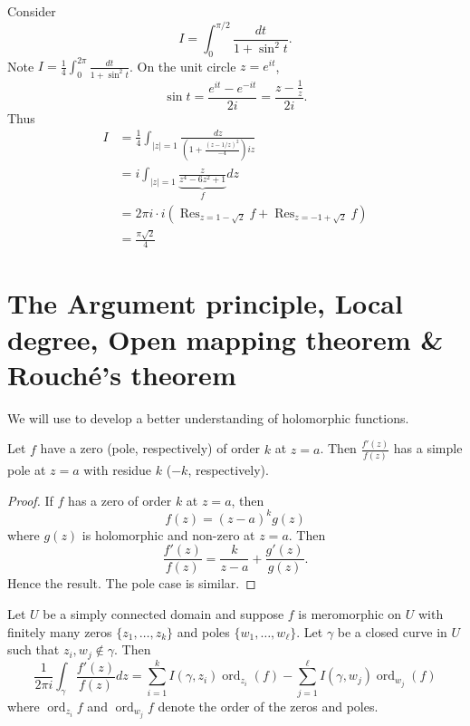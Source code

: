\documentclass[a4paper]{article}
\DeclareMathOperator*{\res}{Res}
\DeclareMathOperator*{\ord}{ord}
\begin{document}
\begin{eg}
  Consider
  \[
    I = \int_0^{\pi/2} \frac{dt}{1 + \sin^2 t}.
  \]
  Note \(I = \frac{1}{4} \int_0^{2\pi} \frac{dt}{1 + \sin^2 t}\). On the unit circle \(z = e^{it}\),
  \[
    \sin t = \frac{e^{it} - e^{-it}}{2i} = \frac{z - \frac{1}{z}}{2i}.
  \]
  Thus
  \begin{align*}
    I
    &= \frac{1}{4} \int_{|z| = 1} \frac{dz}{(1 + \frac{(z - 1/z)^2}{-4})iz} \\
    &= i \int_{|z| = 1} \underbrace{\frac{z}{z^4 - 6z^2 + 1}}_f dz \\
    &= 2\pi i \cdot i (\res_{z = 1 - \sqrt 2} f + \res_{z = -1 + \sqrt 2} f) \\
    &= \frac{\pi\sqrt 2}{4}
  \end{align*}
\end{eg}

\section{The Argument principle, Local degree, Open mapping theorem \& Rouché's theorem}

We will use  to develop a better understanding of holomorphic functions.

\begin{proposition}
  Let \(f\) have a zero (pole, respectively) of order \(k\) at \(z = a\). Then \(\frac{f'(z)}{f(z)}\) has a simple pole at \(z = a\) with residue \(k\) (\(-k\), respectively).
\end{proposition}

\begin{proof}
  If \(f\) has a zero of order \(k\) at \(z = a\), then
  \[
    f(z) = (z - a)^k g(z)
  \]
  where \(g(z)\) is holomorphic and non-zero at \(z = a\). Then
  \[
    \frac{f'(z)}{f(z)} = \frac{k}{z - a} + \frac{g'(z)}{g(z)}.
  \]
  Hence the result. The pole case is similar.
\end{proof}

\begin{theorem}
  \label{thm:argument principle}
  Let \(U\) be a simply connected domain and suppose \(f\) is meromorphic on \(U\) with finitely many zeros \(\{z_1, \dots, z_k\}\) and poles \(\{w_1, \dots, w_\ell\}\). Let \(\gamma\) be a closed curve in \(U\) such that \(z_i, w_j \notin \gamma\). Then
  \[
    \frac{1}{2\pi i} \int_\gamma \frac{f'(z)}{f(z)} dz
    = \sum_{i = 1}^k I(\gamma, z_i) \ord_{z_i}(f)
    - \sum_{j = 1}^\ell I(\gamma, w_j) \ord_{w_j}(f)
  \]
  where \(\ord_{z_i} f\) and \(\ord_{w_j} f\) denote the order of the zeros and poles.
\end{theorem}
\end{document}

